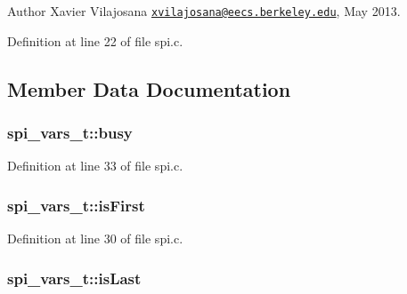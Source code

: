 \begin{DoxyAuthor}{Author}
Xavier Vilajosana \href{mailto:xvilajosana@eecs.berkeley.edu}{\tt xvilajosana@eecs.\+berkeley.\+edu}, May 2013. 
\end{DoxyAuthor}


Definition at line 22 of file spi.\+c.



\subsection{Member Data Documentation}
\subsubsection[{\texorpdfstring{busy}{busy}}]{ spi\+\_\+vars\+\_\+t\+::busy}\hypertarget{structspi__vars__t_a9cdd1f9be37409d29b7a76ca33514e23}{}\label{structspi__vars__t_a9cdd1f9be37409d29b7a76ca33514e23}


Definition at line 33 of file spi.\+c.

\subsubsection[{\texorpdfstring{is\+First}{isFirst}}]{ spi\+\_\+vars\+\_\+t\+::is\+First}\hypertarget{structspi__vars__t_a437ce98251c491082689c63d85098b76}{}\label{structspi__vars__t_a437ce98251c491082689c63d85098b76}


Definition at line 30 of file spi.\+c.

\subsubsection[{\texorpdfstring{is\+Last}{isLast}}]{ spi\+\_\+vars\+\_\+t\+::is\+Last}\hypertarget{structspi__vars__t_a807da5fee1e4af51e310efd1879b8137}{}\label{structspi__vars__t_a807da5fee1e4af51e310efd1879b8137}


